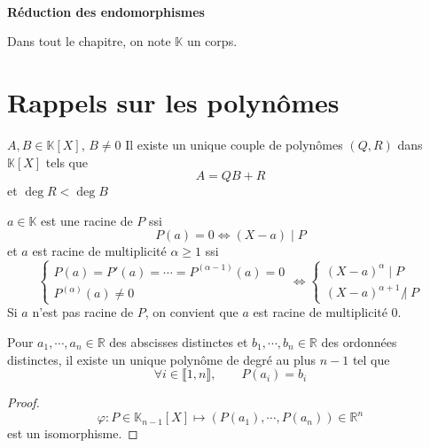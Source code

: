 \ifsolo
    ~

    \vspace{1cm}

    \begin{center}
        \textbf{\LARGE Réduction des endomorphismes} \\[1em]
    \end{center}
    \tableofcontents
\else
    \minitoc
\fi
\thispagestyle{empty}

\ifsolo \newpage \setcounter{page}{1} \fi

Dans tout le chapitre, on note $\mathbb K$ un corps.

\section{Rappels sur les polynômes}

\begin{thm}
    \Hyp $A, B\in \mathbb K[X]$, $B\neq 0$
    \Conc Il existe un unique couple de polynômes $(Q, R)$ dans $\mathbb K[X]$ tels que \[
        A=QB+R
    \]
    et $\deg R<\deg B$
\end{thm}

\begin{thmdef}
    $a\in\mathbb K$ est une racine de $P$ ssi \[
    P(a)=0\iff (X-a)\;|\;P
\]
et $a$ est racine de multiplicité $\alpha \geq 1$ ssi \[
    \begin{cases}
        P(a)=P'(a)=\cdots=P^{(\alpha - 1)}(a)=0 \\
        P^{(\alpha)}(a)\neq 0
    \end{cases}
    \iff \begin{cases}
        (X-a)^\alpha \; |\; P\\
        (X-a)^{\alpha+1}\;\not|\;P
    \end{cases}
\]
Si $a$ n'est pas racine de $P$, on convient que $a$ est racine de multiplicité $0$.
\end{thmdef}

\begin{thm}
     Pour $a_1, \cdots, a_n\in\mathbb R$ des abscisses distinctes et $b_1, \cdots, b_n\in\mathbb R$ des ordonnées distinctes, il existe un unique polynôme de degré au plus $n-1$ tel que \[
        \forall i\in\llbracket 1, n\rrbracket, \qquad P(a_i)=b_i
    \]
\end{thm}
\begin{proof}
    \[
        \varphi:P\in\mathbb K_{n-1}[X]\longmapsto (P(a_1), \cdots, P(a_n))\in\mathbb R^n
    \]
    est un isomorphisme.
\end{proof}

